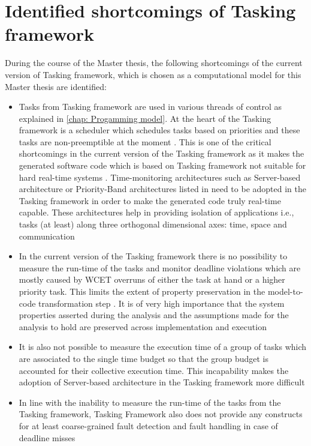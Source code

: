 \section{Identified shortcomings of Tasking framework}
\label{section: Identififed shortcomings}
During the course of the Master thesis, the following shortcomings of the current version of Tasking framework, which is chosen as a computational model for this Master thesis are identified:
\begin{itemize}
\item Tasks from Tasking framework are used in various threads of control as explained in \cref{chap: Progamming model}. At the heart of the Tasking framework is a scheduler which schedules tasks based on priorities and these tasks are non-preemptible at the moment \cite{TaskFr}. This is one of the critical shortcomings in the current version of the Tasking framework as it makes the generated software code which is based on Tasking framework not suitable for hard real-time systems \cite{TempIsolation}. Time-monitoring architectures such as Server-based architecture or Priority-Band architectures listed in \cite{TempIsolation} need to be adopted in the Tasking framework in order to make the generated code truly real-time capable. These architectures help in providing isolation of applications i.e., tasks (at least) along three orthogonal dimensional axes: time, space and communication \cite{TempIsolation}
\item In the current version of the Tasking framework there is no possibility to measure the run-time of the tasks and monitor deadline violations which are mostly caused by WCET overruns of either the task at hand or a higher priority task. This limits the extent of property preservation in the model-to-code transformation step \cite{TempIsolation}. It is of very high importance that the system properties asserted during the analysis and the assumptions made for the analysis to hold are preserved across implementation and execution \cite{EvoRAVCodeAr}\cite{TempIsolation}
\item It is also not possible to measure the execution time of a group of tasks which are associated to the single time budget so that the group budget is accounted for their collective execution time. This incapability makes the adoption of Server-based architecture in the Tasking framework more difficult \cite{TempIsolation}
\item In line with the inability to measure the run-time of the tasks from the Tasking framework, Tasking Framework also does not provide any constructs for at least coarse-grained fault detection and fault handling in case of deadline misses 
\end{itemize}

